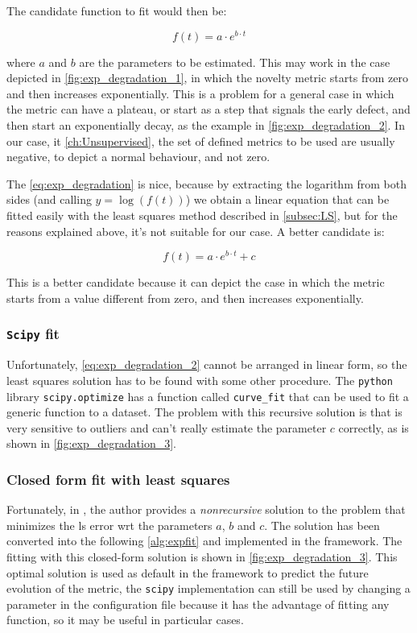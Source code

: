 The candidate function to fit would then be:

\begin{equation}
    \label{eq:exp_degradation}
    f(t) = a \cdot e^{b \cdot t}
\end{equation}

where $a$ and $b$ are the parameters to be estimated. This may work in the case depicted in \autoref{fig:exp_degradation_1}, in which the novelty metric starts from zero and then increases exponentially. This is a problem for a general case in which the metric can have a plateau, or start as a step that signals the early defect, and then start an exponentially decay, as the example in \autoref{fig:exp_degradation_2}. In our case, it \autoref{ch:Unsupervised}, the set of defined metrics to be used are usually negative, to depict a normal behaviour, and not zero. 

The \autoref{eq:exp_degradation} is nice, because by extracting the logarithm from both sides (and calling $y = \log(f(t))$) we obtain a linear equation that can be fitted easily with the least squares method described in \autoref{subsec:LS}, but for the reasons explained above, it's not suitable for our case. A better candidate is:

\begin{equation}
    \label{eq:exp_degradation_2}
    f(t) = a \cdot e^{b \cdot t} + c
\end{equation}

This is a better candidate because it can depict the case in which the metric starts from a value different from zero, and then increases exponentially.

\subsubsection{\texttt{Scipy} fit}
Unfortunately, \autoref{eq:exp_degradation_2} cannot be arranged in linear form, so the least squares solution has to be found with some other procedure. The \texttt{python} library \texttt{scipy.optimize} has a function called \texttt{curve\_fit} that can be used to fit a generic function to a dataset. The problem with this recursive solution is that is very sensitive to outliers and can't really estimate the parameter $c$ correctly, as is shown in \autoref{fig:exp_degradation_3}.

\subsubsection{Closed form fit with least squares}
Fortunately, in \cite{Exp_fit}, the author provides a \emph{nonrecursive} solution to the problem that minimizes the \gls{ls} error \gls{wrt} the parameters $a$, $b$ and $c$. The solution has been converted into the following \autoref{alg:expfit} and implemented in the framework. The fitting with this closed-form solution is shown in \autoref{fig:exp_degradation_3}. This optimal solution is used as default in the framework to predict the future evolution of the metric, the \texttt{scipy} implementation can still be used by changing a parameter in the configuration file because it has the advantage of fitting any function, so it may be useful in particular cases.

